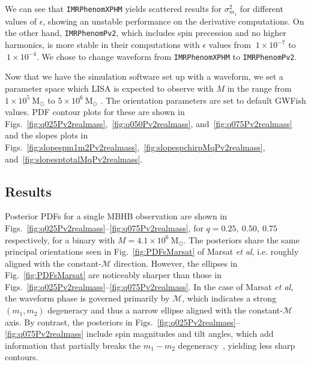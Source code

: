 \documentclass[a4paper,12pt]{article}
\begin{document}
We can see that \texttt{IMRPhenomXPHM} yields scattered results for $\sigma^{2}_{m_1}$ for different values of $\epsilon$, showing an unstable performance on the derivative computations. On the other hand, \texttt{IMRPhenomPv2}, which includes spin precession and no higher harmonics, is more stable in their computations with $\epsilon$ values from $~1\times10^{-7}$ to $~1\times10^{-4}$. We chose to change waveform from \texttt{IMRPhenomXPHM} to \texttt{IMRPhenomPv2}. 

Now that we have the simulation software set up with a waveform, we set a parameter space which LISA is expected to observe with $M$ in the range from $1\times10^{5}~\mathrm{M}_{\odot}$ to $5\times10^{6}~\mathrm{M}_{\odot}$ \cite{mangiagli2020observing}. The orientation parameters are set to default GWFish values. PDF contour plots for these are shown in Figs.~\ref{fig:q025Pv2realmass},~\ref{fig:q050Pv2realmass}, and~\ref{fig:q075Pv2realmass} and the slopes plots in Figs.~\ref{fig:slopespm1m2Pv2realmass},~\ref{fig:slopespchirpMqPv2realmass}, and~\ref{fig:slopesptotalMqPv2realmass}.

\subsection{Results}
\label{subsec:results_singleMBHB}

Posterior PDFs for a single MBHB observation are shown in Figs.~\ref{fig:q025Pv2realmass}--\ref{fig:q075Pv2realmass}, for $q=0.25,~0.50,~0.75$ respectively, for a binary with $M=4.1\times10^6~\mathrm{M}_{\odot}$. The posteriors share the same principal orientations seen in Fig.~\ref{fig:PDFsMarsat} of Marsat \textit{et al}, i.e. roughly aligned with the constant-$\mathcal{M}$ direction. However, the ellipses in Fig.~\ref{fig:PDFsMarsat} are noticeably sharper than those in Figs.~\ref{fig:q025Pv2realmass}--\ref{fig:q075Pv2realmass}. In the case of Marsat \textit{et al}, the waveform phase is governed primarily by $\mathcal{M}$, which indicates a strong $(m_1,m_2)$ degeneracy and thus a narrow ellipse aligned with the constant-$\mathcal{M}$ axis. By contrast, the posteriors in Figs.~\ref{fig:q025Pv2realmass}--\ref{fig:q075Pv2realmass} include spin magnitudes and tilt angles, which add information that partially breaks the $m_1-m_2$ degeneracy~\cite{marsat2021exploring}, yielding less sharp contours.
\end{document}
